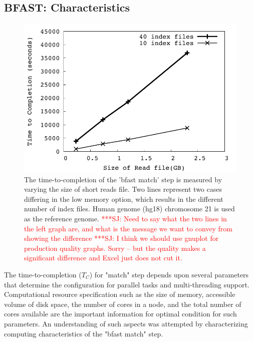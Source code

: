 \documentclass[12pt]{article}
\newcommand{\jhanote}[1]{ {\textcolor{red}     {***SJ: #1}}}
\newcommand{\jhanote}[1]{}
\begin{document}


\subsection{BFAST: Characteristics}

\begin{figure}
 \centering
\includegraphics[scale=0.66]{figures/readsvstime.pdf}

\caption{\small The time-to-completion of the 'bfast match' step is measured by varying the size of short reads file.  Two lines represent two cases differing in the low memory option, which results in the different number of index files.  Human genome (hg18) chromosome 21 is used as the reference genome. \jhanote{Need to say what the two lines in the left graph are, and what is the message we want to convey from showing the difference} \jhanote{I think we should use gnuplot for production quality graphs. Sorry -- but the quality makes a significant difference and Excel just does not cut it.}}
  \label{fig:parallel-execution} 
 \end{figure}


The time-to-completion ($T_C$) for "match" step depends upon several parameters that determine the configuration for parallel tasks and multi-threading support.  Computational resource specification such as the size of memory, accessible volume of disk space, the number of cores in a node, and the total number of cores available are the important information for optimal condition for such parameters.  An understanding of such aspects was attempted by characterizing computing characteristics of the "bfast match" step.  
\end{document}
